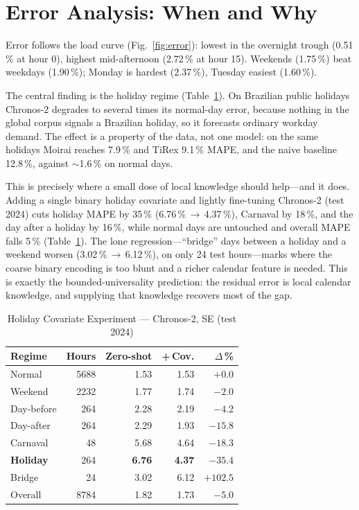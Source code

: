 \documentclass[conference]{IEEEtran}
\begin{document}
\section{Error Analysis: When and Why}
Error follows the load curve (Fig.~\ref{fig:error}): lowest in the overnight trough
(0.51\,\% at hour 0), highest mid-afternoon (2.72\,\% at hour 15). Weekends (1.75\,\%)
beat weekdays (1.90\,\%); Monday is hardest (2.37\,\%), Tuesday easiest (1.60\,\%).

The central finding is the holiday regime (Table~\ref{tab:holiday}). On Brazilian public
holidays Chronos-2 degrades to several times its normal-day error, because nothing in the
global corpus signals a Brazilian holiday, so it forecasts ordinary workday demand. The
effect is a property of the data, not one model: on the same holidays Moirai reaches
7.9\,\% and TiRex 9.1\,\% MAPE, and the naive baseline 12.8\,\%, against $\sim$1.6\,\% on
normal days.

This is precisely where a small dose of local knowledge should help---and it does. Adding
a single binary holiday covariate and lightly fine-tuning Chronos-2 (test 2024) cuts
holiday MAPE by 35\,\% (6.76\,\%\,$\rightarrow$\,4.37\,\%), Carnaval by 18\,\%, and the
day after a holiday by 16\,\%, while normal days are untouched and overall MAPE falls
5\,\% (Table~\ref{tab:holiday}). The lone regression---``bridge'' days between a holiday
and a weekend worsen (3.02\,\%\,$\rightarrow$\,6.12\,\%), on only 24 test hours---marks
where the coarse binary encoding is too blunt and a richer calendar feature is needed.
This is exactly the bounded-universality prediction: the residual error is local calendar
knowledge, and supplying that knowledge recovers most of the gap.

\begin{table}[t]
\centering
\caption{Holiday Covariate Experiment --- Chronos-2, SE (test 2024)}
\label{tab:holiday}
\begin{tabular}{lrrrr}
\toprule
Regime & Hours & Zero-shot & +\,Cov. & $\Delta$\,\% \\
\midrule
Normal      & 5688 & 1.53 & 1.53 & $+0.0$ \\
Weekend     & 2232 & 1.77 & 1.74 & $-2.0$ \\
Day-before  &  264 & 2.28 & 2.19 & $-4.2$ \\
Day-after   &  264 & 2.29 & 1.93 & $-15.8$ \\
Carnaval    &   48 & 5.68 & 4.64 & $-18.3$ \\
\textbf{Holiday} & 264 & \textbf{6.76} & \textbf{4.37} & $\mathbf{-35.4}$ \\
Bridge      &   24 & 3.02 & 6.12 & $+102.5$ \\
\midrule
Overall     & 8784 & 1.82 & 1.73 & $-5.0$ \\
\bottomrule
\end{tabular}
\end{table}
\end{document}
